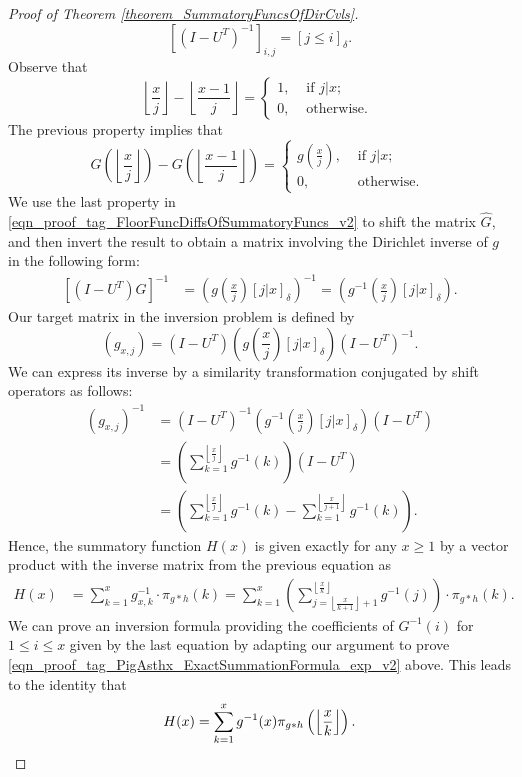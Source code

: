 \documentclass[11pt,reqno,a4letter]{article}
\numberwithin{figure}{section}
\numberwithin{table}{section}
\newcommand{\Iverson}[1]{\ensuremath{\left[#1\right]_{\delta}}}
\newcommand{\floor}[1]{\left\lfloor #1 \right\rfloor}
\newcommand{\Floor}[2]{\ensuremath{\left\lfloor \frac{#1}{#2} \right\rfloor}}
\theoremstyle{plain}
\numberwithin{theorem}{section}
\theoremstyle{definition}
\begin{document}
\begin{proof}[Proof of Theorem \ref{theorem_SummatoryFuncsOfDirCvls}]
\[
\left[(I - U^T)^{-1}\right]_{i,j} = \Iverson{j \leq i}. 
\]
Observe that 
\[
\Floor{x}{j} - \Floor{x-1}{j} = \begin{cases} 
     1, & \text{ if $j|x$; } \\ 
     0, & \text{ otherwise. } 
     \end{cases} 
\] 
The previous property implies that 
\begin{equation} 
\label{eqn_proof_tag_FloorFuncDiffsOfSummatoryFuncs_v2} 
G\left(\floor{\frac{x}{j}}\right) - G\left(\floor{\frac{x-1}{j}}\right) = 
     \begin{cases} 
     g\left(\frac{x}{j}\right), & \text{ if $j | x$; } \\ 
     0, & \text{ otherwise. } 
     \end{cases}
\end{equation} 
We use the last property in \eqref{eqn_proof_tag_FloorFuncDiffsOfSummatoryFuncs_v2} 
to shift the matrix $\hat{G}$, and then invert the result to obtain a matrix involving the 
Dirichlet inverse of $g$ in the following form: 
\begin{align*} 
\left[(I-U^{T}) \hat{G}\right]^{-1} & = \left(g\left(\frac{x}{j}\right) \Iverson{j|x}\right)^{-1} = 
     \left(g^{-1}\left(\frac{x}{j}\right) \Iverson{j|x}\right). 
\end{align*} 
Our target matrix in the inversion problem is defined by 
$$(g_{x,j}) = (I-U^{T}) \left(g\left(\frac{x}{j}\right) \Iverson{j|x}\right) (I-U^{T})^{-1}.$$
We can express its inverse by a similarity transformation conjugated by shift operators as follows: 
\begin{align*} 
(g_{x,j})^{-1} & = (I-U^{T})^{-1} \left(g^{-1}\left(\frac{x}{j}\right) \Iverson{j|x}\right) (I-U^{T}) \\ 
     & = \left(\sum_{k=1}^{\floor{\frac{x}{j}}} g^{-1}(k)\right) (I-U^{T}) \\ 
     & = \left(\sum_{k=1}^{\floor{\frac{x}{j}}} g^{-1}(k) - \sum_{k=1}^{\floor{\frac{x}{j+1}}} g^{-1}(k)\right). 
\end{align*} 
Hence, the summatory function $H(x)$ is given exactly for any $x \geq 1$ 
by a vector product with the inverse matrix from the previous equation as 
\begin{align*} 
H(x) & = \sum_{k=1}^x g_{x,k}^{-1} \cdot \pi_{g \ast h}(k) 
     = \sum_{k=1}^x \left(\sum_{j=\floor{\frac{x}{k+1}}+1}^{\floor{\frac{x}{k}}} g^{-1}(j)\right) 
     \cdot \pi_{g \ast h}(k). 
\end{align*} 
We can prove an inversion formula providing the coefficients of $G^{-1}(i)$ for $1 \leq i \leq x$ given 
by the last equation by adapting our argument to prove 
\eqref{eqn_proof_tag_PigAsthx_ExactSummationFormula_exp_v2} above. 
This leads to the identity that 
\[
H(x) = \sum_{k=1}^{x} g^{-1}(x) \pi_{g \ast h}\left(\Floor{x}{k}\right). 
     \qedhere 
\]
\end{proof} 
\end{document}
